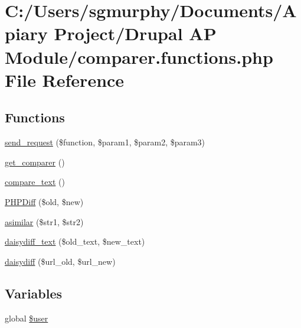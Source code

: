 \hypertarget{comparer_8functions_8php}{
\section{C:/Users/sgmurphy/Documents/Apiary Project/Drupal AP Module/comparer.functions.php File Reference}
\label{comparer_8functions_8php}
}
\subsection*{Functions}
\begin{DoxyCompactItemize}
\item 
\hyperlink{comparer_8functions_8php_a78bd2c85ad1dcdc1fb68e40605d593b0}{send\_\-request} (\$function, \$param1, \$param2, \$param3)
\item 
\hyperlink{comparer_8functions_8php_aad11dd972f6f5ce0ef30f089e4a7686c}{get\_\-comparer} ()
\item 
\hyperlink{comparer_8functions_8php_ac5cb087f09745fea9c8721f198b38179}{compare\_\-text} ()
\item 
\hyperlink{comparer_8functions_8php_a0f38a41d4ad4a9c68a214af946514c3a}{PHPDiff} (\$old, \$new)
\item 
\hyperlink{comparer_8functions_8php_a15529edea898e11a52232cc4baec11d1}{asimilar} (\$str1, \$str2)
\item 
\hyperlink{comparer_8functions_8php_a810bd640e21ac2129a0e7f53f5d45164}{daisydiff\_\-text} (\$old\_\-text, \$new\_\-text)
\item 
\hyperlink{comparer_8functions_8php_ae170b4e0e13feab0bbbde7445f320bed}{daisydiff} (\$url\_\-old, \$url\_\-new)
\end{DoxyCompactItemize}
\subsection*{Variables}
\begin{DoxyCompactItemize}
\item 
global \hyperlink{comparer_8functions_8php_a00365e6c5f70c43fb2ed86c9bc5626e0}{\$user}
\end{DoxyCompactItemize}


